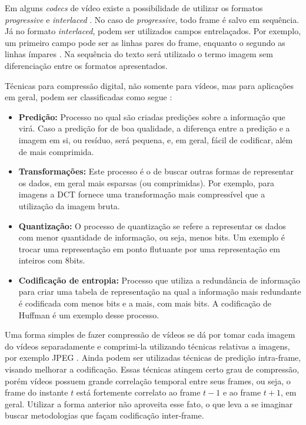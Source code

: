 \documentclass[cic,tc]{iiufrgs}
\begin{document}
Em alguns \emph{codecs} de vídeo existe a possibilidade de utilizar os formatos
\emph{progressive} e \emph{interlaced} \cite{SullivanH264}.
No caso de \emph{progressive}, todo frame é salvo em sequência.
Já no formato \emph{interlaced}, podem ser utilizados campos entrelaçados.
Por exemplo, um primeiro campo pode ser as linhas pares do frame, enquanto o segundo
as linhas ímpares \cite{SullivanH264}.
Na sequência do texto será utilizado o termo imagem sem diferenciação entre os 
formatos apresentados.

Técnicas para compressão digital, não somente para vídeos, mas para aplicações em geral,
podem ser classificadas como segue \cite{SullivanH264}:
\begin{itemize}
    \item \textbf{Predição:} Processo no qual são criadas predições sobre a informação 
    que virá. Caso a predição for de boa qualidade, a diferença entre a predição e a 
    imagem em si, ou resíduo, será pequena, e, em geral, fácil de codificar, além de mais
    comprimida.
    \item \textbf{Transformações:} Este processo é o de buscar outras formas de representar
    os dados, em geral mais esparsas (ou comprimidas). Por exemplo, para imagens a DCT 
    fornece uma transformação mais compressível que a utilização da imagem bruta.
    \item \textbf{Quantização:} O processo de quantização se refere a representar os dados
    com menor quantidade de informação, ou seja, menos bits. Um exemplo é trocar uma representação 
    em ponto flutuante por uma representação em inteiros com 8bits.
    \item \textbf{Codificação de entropia:} Processo que utiliza a redundância de informação para 
    criar uma tabela de representação na qual a informação mais redundante é codificada
    com menos bits e a mais, com mais bits. A codificação de Huffman é um exemplo desse processo.
\end{itemize}

Uma forma simples de fazer compressão de vídeos se dá por tomar cada imagem do vídeos
separadamente e comprimi-la utilizando técnicas relativas a imagens, por exemplo JPEG \cite{SullivanH264}.
Ainda podem ser utilizadas técnicas de predição intra-frame, visando melhorar a codificação.
Essas técnicas atingem certo grau de compressão, porém vídeos possuem grande correlação temporal
entre seus frames, ou seja, o frame do instante $t$ está fortemente correlato ao frame $t-1$ e
ao frame $t+1$, em geral.
Utilizar a forma anterior não aproveita esse fato, o que leva a se imaginar buscar metodologias
que façam codificação inter-frame.
\end{document}
